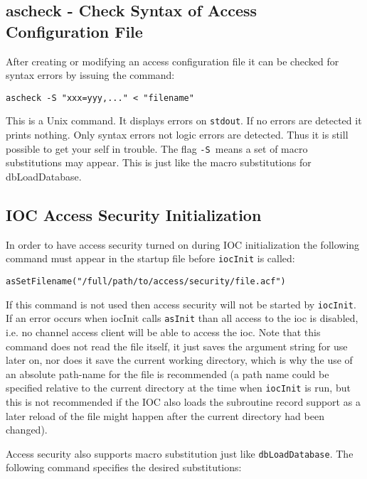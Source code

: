 \subsection{ascheck - Check Syntax of Access Configuration File}

After creating or modifying an access configuration file it can be checked for syntax errors by issuing the command:

\begin{verbatim}ascheck -S "xxx=yyy,..." < "filename"
\end{verbatim}This is a Unix command. It displays errors on \verb|stdout|. If no errors are detected it prints nothing. Only syntax errors not 
logic errors are detected. Thus it is still possible to get your self in trouble. The flag \verb|-S |means a set of macro 
substitutions may appear. This is just like the macro substitutions for dbLoadDatabase.

\subsection{IOC Access Security Initialization}

In order to have access security turned on during IOC initialization the following command must appear in the startup file 
before \verb|iocInit| is called:

\begin{verbatim}asSetFilename("/full/path/to/access/security/file.acf")
\end{verbatim}If this command is not used then access security will not be started by \verb|iocInit|. If an error occurs when iocInit calls 
\verb|asInit| than all access to the ioc is disabled, i.e. no channel access client will be able to access the ioc. Note that this 
command does not read the file itself, it just saves the argument string for use later on, nor does it save the current 
working directory, which is why the use of an absolute path-name for the file is recommended (a path name could be 
specified relative to the current directory at the time when \verb|iocInit| is run, but this is not recommended if the IOC also 
loads the subroutine record support as a later reload of the file might happen after the current directory had been changed).

Access security also supports macro substitution just like \verb|dbLoadDatabase|. The following command specifies the 
desired substitutions:

